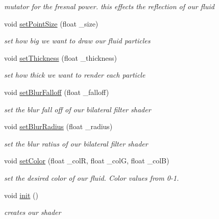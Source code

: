 \begin{DoxyCompactItemize}
\begin{DoxyCompactList}\small\item\em mutator for the fresnal power. this effects the reflection of our fluid \end{DoxyCompactList}\item 
void \hyperlink{class_fluid_shader_aa48f21bea9b0fbb456753442f874d10d}{set\-Point\-Size} (float \-\_\-size)
\begin{DoxyCompactList}\small\item\em set how big we want to draw our fluid particles \end{DoxyCompactList}\item 
void \hyperlink{class_fluid_shader_a076afe8aa143ad01ac4fc2a3b9078305}{set\-Thickness} (float \-\_\-thickness)
\begin{DoxyCompactList}\small\item\em set how thick we want to render each particle \end{DoxyCompactList}\item 
void \hyperlink{class_fluid_shader_a5180f954e326d1f70b83efe5fcaea748}{set\-Blur\-Falloff} (float \-\_\-falloff)
\begin{DoxyCompactList}\small\item\em set the blur fall off of our bilateral filter shader \end{DoxyCompactList}\item 
void \hyperlink{class_fluid_shader_ac9b7d6ee1135c3089894e5db3292bd0e}{set\-Blur\-Radius} (float \-\_\-radius)
\begin{DoxyCompactList}\small\item\em set the blur ratius of our bilateral filter shader \end{DoxyCompactList}\item 
void \hyperlink{class_fluid_shader_a21f895c071bf27ba60f780138211c710}{set\-Color} (float \-\_\-col\-R, float \-\_\-col\-G, float \-\_\-col\-B)
\begin{DoxyCompactList}\small\item\em set the desired color of our fluid. Color values from 0-\/1. \end{DoxyCompactList}\item 
\hypertarget{class_fluid_shader_ae719bbf1e465c9cc116682c3e5ac6604}{void \hyperlink{class_fluid_shader_ae719bbf1e465c9cc116682c3e5ac6604}{init} ()}\label{class_fluid_shader_ae719bbf1e465c9cc116682c3e5ac6604}

\begin{DoxyCompactList}\small\item\em creates our shader \end{DoxyCompactList}\end{DoxyCompactItemize}
